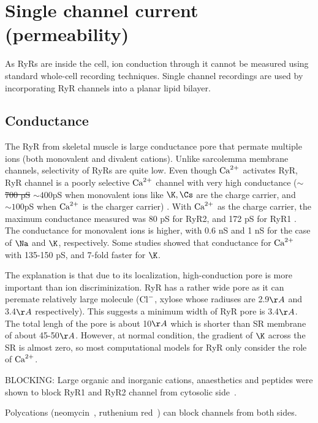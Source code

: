 \section{Single channel current (permeability)}
\label{sec:i_1ryr}

As RyRs are inside the cell, ion conduction through it cannot be measured using
standard whole-cell recording techniques. Single channel recordings are used
by incorporating RyR channels into a planar lipid bilayer.

\subsection{Conductance}

The RyR from skeletal muscle is large conductance pore that permate multiple
ions (both monovalent and divalent cations). Unlike sarcolemma membrane
channels, selectivity of RyRs are quite low. Even though ${\text{Ca}^{2+}}$ activates RyR,
RyR channel is a poorly selective ${\text{Ca}^{2+}}$ channel with very high conductance
(\sout{$\sim$ 700 pS} $\sim 400$pS when monovalent ions like $\K, \Cs$ are the
charge carrier, and $\sim 100$pS when ${\text{Ca}^{2+}}$ is the charger carrier)
\citep{Lai1988d, brillantes1994}. With ${\text{Ca}^{2+}}$ as the charge carrier, the maximum
conductance measured was 80 pS for RyR2, and 172 pS for RyR1
\citep{smith1988prr, lindsay1991, zucchi1997}. The conductance for monovalent
ions is higher, with 0.6 nS and 1 nS for the case of $\Na$ and $\K$,
respectively. Some studies showed that conductance for ${\text{Ca}^{2+}}$ with 135-150 pS,
and 7-fold faster for $\K$.

The explanation is that due to its localization, high-conduction pore is more
important than ion discriminization. RyR has a rather wide pore as it can
peremate relatively large molecule (${\text{Cl}^{-}}$, xylose whose radiuses are 2.9$\AA$
and 3.4$\AA$ respectively). This suggests a minimum width of RyR pore is
3.4$\AA$. The total lengh of the pore is about 10$\AA$ which is shorter than SR
membrane of about 45-50$\AA$. However, at normal condition, the gradient of $\K$
across the SR is almost zero, so most computational models for RyR only consider
the role of ${\text{Ca}^{2+}}$.

\begin{framed}
BLOCKING: Large organic and inorganic cations, anaesthetics and peptides were
shown to block RyR1 and RyR2 channel from
cytosolic side~\citep{Tinker1992, Tinker1992a,
Tinker1992b, Tinker1993}.

Polycations (neomycin~\citep{Mead2004}, ruthenium red~\citep{Xu1999}) can block
channels from both sides.
\end{framed}

